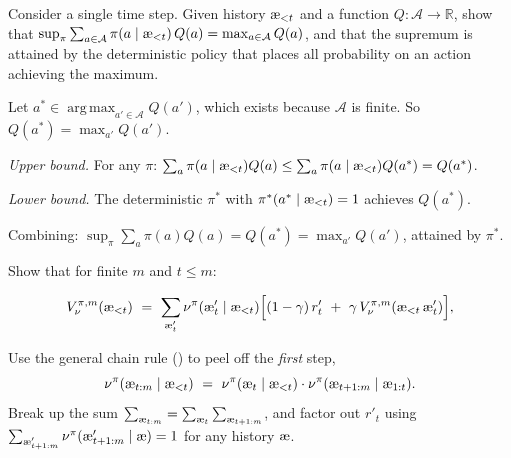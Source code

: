 \documentclass[fontsize=11pt, parskip=half]{scrartcl}
\newcommand{\cA}{\mathcal{A}}
\DeclareMathOperator*{\argmax}{arg\,max}
\newcommand{\aes}{\textnormal{\ae}}
\begin{document}
\begin{exercise}
\label{prob:sup_eq_max}
Consider a single time step. Given history $\aes_{<t}$ and a function $Q : \cA \to \mathbb{R}$, show that $\sup_\pi \sum_{a \in \cA} \pi(a \mid \aes_{<t})\, Q(a) = \max_{a \in \cA} Q(a)$, and that the supremum is attained by the deterministic policy that places all probability on an action achieving the maximum.

\end{exercise}

\begin{solution}
Let $a^* \in \argmax_{a' \in \cA} Q(a')$, which exists because $\cA$ is finite. So $Q(a^*) = \max_{a'} Q(a')$.

\emph{Upper bound.} For any $\pi$:
$\sum_a \pi(a \mid \aes_{<t}) Q(a) \leq \sum_a \pi(a \mid \aes_{<t}) Q(a^*) = Q(a^*)$.

\emph{Lower bound.} The deterministic $\pi^*$ with $\pi^*(a^* \mid \aes_{<t}) = 1$ achieves $Q(a^*)$.

Combining: $\sup_\pi \sum_a \pi(a) Q(a) = Q(a^*) = \max_{a'} Q(a')$, attained by $\pi^*$.
\end{solution}

\begin{exercise}
\label{prob:bellman_finite}
Show that for finite $m$ and $t \leq m$:

\[
    V_\nu^{\pi,m}(\aes_{<t}) ~=~ \sum_{\aes'_t} \nu^\pi(\aes'_t \mid \aes_{<t}) \Big[(1-\gamma)\, r'_t ~+~ \gamma\, V_\nu^{\pi,m}(\aes_{<t}\, \aes'_t)\Big],
\]

\begin{hint}
Use the general chain rule () to peel off the
\emph{first} step,
\[
    \nu^\pi(\aes_{t:m} \mid \aes_{<t})
    ~=~ \nu^\pi(\aes_t \mid \aes_{<t}) \cdot \nu^\pi(\aes_{t+1:m} \mid \aes_{1:t}).
\]
Break up the sum $\sum_{\aes_{t:m}} = \sum_{\aes_t} \sum_{\aes_{t+1:m}}$,
and factor out $r'_t$ using $\sum_{\aes'_{t+1:m}} \nu^\pi(\aes'_{t+1:m} \mid \aes) = 1$
for any history $\aes$.
\end{hint}
\end{exercise}
\end{document}
